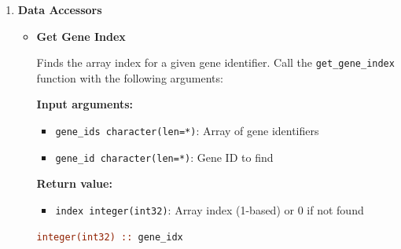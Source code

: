 \documentclass[11pt]{article}
\begin{document}
\begin{enumerate}
\begin{itemize}
	      	\item \textbf{Validate String Array Uniqueness}
	      	      
	      	      Validates that all entries in a string array are unique (no duplicates).
	      	      Uses a hashet implementation internally for O(n) runtime. Call the
	      	      \texttt{validate\_string\_array\_uniqueness} subroutine with the following
	      	      arguments:
	      	      
	      	      \textbf{Input arguments:}
	      	      \begin{itemize}
	      	      	\item \texttt{string\_array character(len=*)}: String array to check
	      	      	      for duplicates
	      	      \end{itemize}
	      	      \textbf{Output arguments:}
	      	      \begin{itemize}
	      	      	\item \texttt{ierr integer(int32)}: Error code
	      	      \end{itemize}
	      	      \begin{lstlisting}[language=Fortran, caption={Validate Unique Strings}]
call validate_string_array_uniqueness(gene_ids, ierr)
call validate_string_array_uniqueness(family_ids, ierr)
	      	      \end{lstlisting}
	      \end{itemize}
	      
	\item \textbf{Data Accessors}
	      \begin{itemize}
	      	\item \textbf{Get Gene Index}
	      	      
	      	      Finds the array index for a given gene identifier. Call the \texttt{get\_gene\_index}
	      	      function with the following arguments:
	      	      
	      	      \textbf{Input arguments:}
	      	      \begin{itemize}
	      	      	\item \texttt{gene\_ids character(len=*)}: Array of gene identifiers
	      	      	      
	      	      	\item \texttt{gene\_id character(len=*)}: Gene ID to find
	      	      \end{itemize}
	      	      \textbf{Return value:}
	      	      \begin{itemize}
	      	      	\item \texttt{index integer(int32)}: Array index (1-based) or 0 if not
	      	      	      found
	      	      \end{itemize}
	      	      \begin{lstlisting}[language=Fortran, caption={Find Gene Index}]
integer(int32) :: gene_idx


\end{lstlisting}
\end{itemize}
\end{enumerate}
\end{document}
